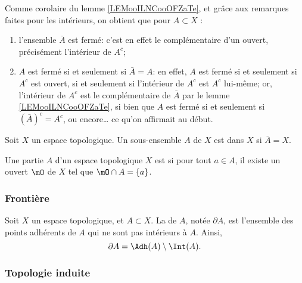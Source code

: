 \begin{remark}\label{RemAdhFerme}
	Comme corolaire du lemme \ref{LEMooILNCooOFZaTe}, et grâce aux remarques faites pour les intérieurs, on obtient que pour \( A \subset X \) :
	\begin{enumerate}
		\item l'ensemble \( \bar A \) est fermé: c'est en effet le complémentaire d'un ouvert, précisément l'intérieur de \( A^c \);
		\item \( A \) est fermé si et seulement si \( \bar A = A \): en effet, \( A \) est fermé si et seulement si \( A^c \) est ouvert, si et seulement si l'intérieur de \( A^c \) est \( A^c \) lui-même; or, l'intérieur de \( A^c \) est le complémentaire de \( \bar A \) par le lemme \ref{LEMooILNCooOFZaTe}, si bien que \( A \) est fermé si et seulement si \( (\bar A)^c  = A^c \), ou encore\dots{} ce qu'on affirmait au début.
	\end{enumerate}
\end{remark}

\begin{definition}\label{DefEnsembleDense}
	Soit \( X \) un espace topologique. Un sous-ensemble \( A \) de \( X \) est  dans \( X \) si \( \bar A = X\).
\end{definition}

\begin{definition}	\label{DEFooQUNJooWZasqV}
	Une partie \( A\) d'un espace topologique \( X\) est  si pour tout \( a\in A\), il existe un ouvert \( \mO\) de \( X\) tel que \( \mO\cap A=\{ a \}\).
\end{definition}

\subsubsection{Frontière}

\begin{definition}
	Soit \( X \) un espace topologique, et \( A \subset X \). La  de \( A \), notée \( \partial A \), est l'ensemble des points adhérents de \( A \) qui ne sont pas intérieurs à \( A \). Ainsi,
	\begin{equation}
		\partial A = \Adh(A) \setminus \Int(A).
	\end{equation}
\end{definition}

\subsubsection{Topologie induite}

